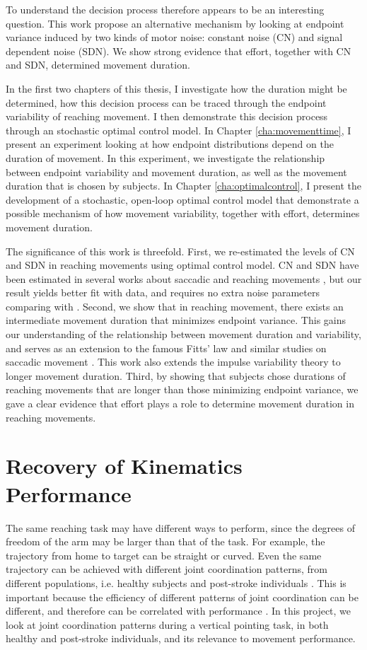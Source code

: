 To understand the decision process therefore appears to be an interesting question. 
This work propose an alternative mechanism by looking at endpoint variance induced by two kinds of motor noise: constant noise (CN) and signal dependent noise (SDN).
We show strong evidence that effort, together with CN and SDN, determined movement duration.

In the first two chapters of this thesis, I investigate how the duration might be determined, how this decision process can be traced through the endpoint variability of reaching movement. I then demonstrate this decision process through an stochastic optimal control model. 
In Chapter \ref{cha:movementtime}, I present an experiment looking at how endpoint distributions depend on the duration of movement. 
In this experiment, we investigate the relationship between endpoint variability and movement duration, as well as the movement duration that is chosen by subjects.
In Chapter \ref{cha:optimalcontrol}, I present the development of a stochastic, open-loop optimal control model that demonstrate a possible mechanism of how movement variability, together with effort, determines movement duration.

The significance of this work is threefold. First, we re-estimated the levels of CN and SDN in reaching movements using optimal control model. 
CN and SDN have been estimated in several works about saccadic \cite{VanBeers2007} and reaching movements \cite{VanBeers2004}, but our result yields better fit with data, and requires no extra noise parameters comparing with \cite{VanBeers2004}. 
Second, we show that in reaching movement, there exists an intermediate movement duration that minimizes endpoint variance. 
This gains our understanding of the relationship between movement duration and variability, and serves as an extension to the famous Fitts’ law \cite{Fitts1954} and similar studies on saccadic movement \cite{VanBeers2007}. 
This work also extends the impulse variability theory \cite{Urbin2011} to longer movement duration. 
Third, by showing that subjects chose durations of reaching movements that are longer than those minimizing endpoint variance, we gave a clear evidence that effort plays a role to determine movement duration in reaching movements.


\section{Recovery of Kinematics Performance}
The same reaching task may have different ways to perform, since the degrees of freedom of the arm may be larger than that of the task. 
For example, the trajectory from home to target can be straight or curved. 
Even the same trajectory can be achieved with different joint coordination patterns, from different populations, i.e. healthy subjects and post-stroke individuals \cite{Cirstea2000}. 
This is important because the efficiency of different patterns of joint coordination can be different, and therefore can be correlated with performance \cite{Sibindi2013}. 
In this project, we look at joint coordination patterns during a vertical pointing task, in both healthy and post-stroke individuals, and its relevance to movement performance.

